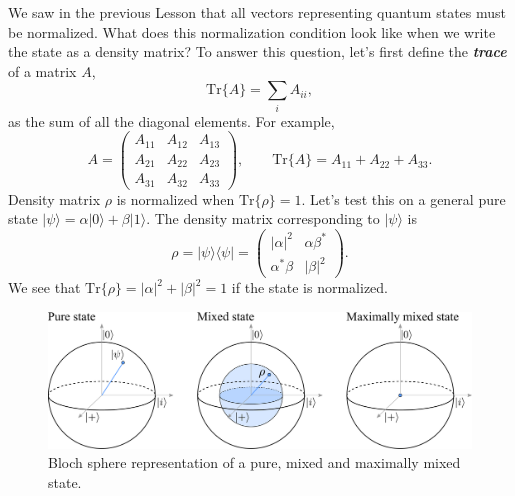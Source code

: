 We saw in the previous Lesson that all vectors representing quantum states must be normalized.
What does this normalization condition look like when we write the state as a density matrix?
To answer this question, let's first define the \textit{\textbf{trace}} of a matrix $A$,
\begin{equation}
    \text{Tr} \{ A \} = \sum_i A_{ii},
\end{equation}
as the sum of all the diagonal elements.
For example,
\begin{equation}
    A = \begin{pmatrix} A_{11} & A_{12} & A_{13} \\ A_{21} & A_{22} & A_{23} \\ A_{31} & A_{32} & A_{33} \end{pmatrix}, \qquad \text{Tr} \{ A \} = A_{11} + A_{22} + A_{33}.
\end{equation}
Density matrix $\rho$ is normalized when $\text{Tr}\{\rho\}=1$.
Let's test this on a general pure state $|\psi\rangle = \alpha |0\rangle + \beta |1\rangle$.
The density matrix  corresponding to $|\psi\rangle$ is
\begin{equation}
    \rho = |\psi\rangle\langle\psi| = \begin{pmatrix} |\alpha|^2 & \alpha\beta^* \\ \alpha^*\beta & |\beta|^2 \end{pmatrix}.
\end{equation}
We see that $\text{Tr}\{\rho\} = |\alpha|^2 + |\beta|^2 = 1$ if the state is normalized.

\begin{figure}[t]
    \centering
    \includegraphics[width=\textwidth]{lesson3/3-3_bloch.pdf}
    \caption[Bloch sphere and mixed states]{Bloch sphere representation of a pure, mixed and maximally mixed state.}
    \label{fig:3-3_bloch}
\end{figure}

